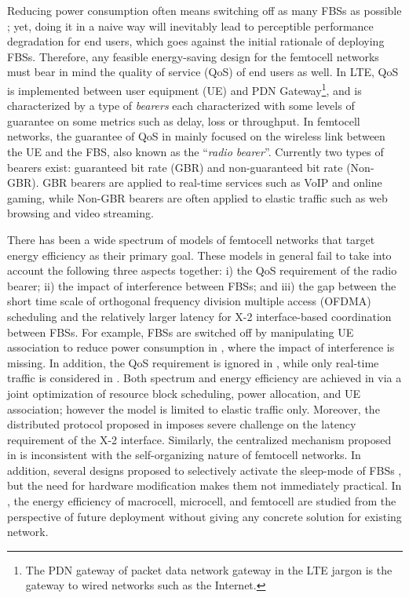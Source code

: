 \documentclass[conference]{IEEEtran}
\begin{document}
Reducing power consumption often means switching off as many FBSs as possible \cite{conte2011cell}; yet, doing it in a naive way will inevitably lead to perceptible performance degradation for end users, which goes against the initial rationale of deploying FBSs. Therefore, any feasible energy-saving design for the femtocell networks must bear in mind the quality of service (QoS) of end users as well. In LTE, QoS is implemented between user equipment (UE) and PDN Gateway\footnote{The PDN gateway of packet data network gateway in the LTE jargon is the gateway to wired networks such as the Internet.}, and is characterized by a type of \textsl{bearers} each characterized with some levels of guarantee on some metrics such as delay, loss or throughput. 
In femtocell networks, the guarantee of QoS in mainly focused on the wireless link between the UE and the FBS, also known as the ``\textsl{radio bearer}''. Currently two types of bearers exist: guaranteed bit rate (GBR) and non-guaranteed bit rate (Non-GBR). GBR bearers are applied to real-time services such as VoIP and online gaming, while Non-GBR bearers are often applied to elastic traffic such as web browsing and video streaming.



There has been a wide spectrum of models of femtocell networks that target energy efficiency as their primary goal. These models in general fail to take into account the following three aspects together: i) the QoS requirement of the radio bearer; ii) the impact of interference between FBSs; and iii) the gap between the short time scale of orthogonal frequency division multiple access (OFDMA) scheduling and the relatively larger latency for X-2 interface-based coordination between FBSs. For example, FBSs are switched off by manipulating UE association to reduce power consumption in \cite{conte2011cell,zhou2009green,peng2014greenbsn,son2011base}, where the impact of interference is missing. In addition, the QoS requirement is ignored in \cite{conte2011cell,peng2014greenbsn}, while only real-time traffic is considered in \cite{zhou2009green,son2011base}. Both spectrum and energy efficiency are achieved in \cite{hou2013energy} via a joint optimization of resource block scheduling, power allocation, and UE association; however the model is limited to elastic traffic only. Moreover, the distributed protocol proposed in \cite{hou2013energy} imposes severe challenge on the latency requirement of the X-2 interface. Similarly, the centralized mechanism proposed in \cite{saker2012optimal} is inconsistent with the self-organizing nature of femtocell networks. In addition, several designs proposed to selectively activate the sleep-mode of FBSs \cite{claussen2010dynamic}, but the need for hardware modification makes them not immediately practical. In \cite{dufkova2011energy}, the energy efficiency of macrocell, microcell, and femtocell are studied from the perspective of future deployment without giving any concrete solution for existing network.
\end{document}
